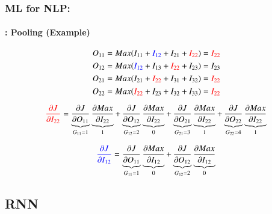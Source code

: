 \documentclass[xcolor=table]{beamer}
\begin{document}
	\begin{frame}
		\frametitle{ML for NLP: \insertsection}
		\framesubtitle{\insertsubsection: Pooling (Example)}
		
		\begin{center}
			\vskip-6pt
		\end{center}\vskip-16pt
		
		{\scriptsize 
			\[O_{11} = Max(I_{11} + \textcolor{blue}{I_{12}} + I_{21} + \textcolor{red}{I_{22}}) = \textcolor{red}{I_{22}}  \]
			\[O_{12} = Max(\textcolor{blue}{I_{12}} + I_{13} + \textcolor{red}{I_{22}} + I_{23}) = I_{23}  \]
			\[O_{21} = Max(I_{21} + \textcolor{red}{I_{22}} + I_{31} + I_{32}) = \textcolor{red}{I_{22}} \]
			\[O_{22} = Max(\textcolor{red}{I_{22}} + I_{23} + I_{32} + I_{33}) = \textcolor{red}{I_{22}}  \]
			
			\[\textcolor{red}{\frac{\partial J}{\partial I_{22}}} 
			= \underbrace{\frac{\partial J}{\partial O_{11}}}_{G_{11} = 1} 
			\underbrace{\frac{\partial Max}{\partial I_{22}}}_{1}
			+ \underbrace{\frac{\partial J}{\partial O_{12}}}_{G_{12} = 2} 
			\underbrace{\frac{\partial Max}{\partial I_{22}}}_{0}
			+ \underbrace{\frac{\partial J}{\partial O_{21}}}_{G_{21} = 3} 
			\underbrace{\frac{\partial Max}{\partial I_{22}}}_{1}
			+ \underbrace{\frac{\partial J}{\partial O_{22}}}_{G_{22} = 4} 
			\underbrace{\frac{\partial Max}{\partial I_{22}}}_{1}\]
			
			\[\textcolor{blue}{\frac{\partial J}{\partial I_{12}}} 
			= \underbrace{\frac{\partial J}{\partial O_{11}}}_{G_{11} = 1} 
			\underbrace{\frac{\partial Max}{\partial I_{12}}}_{0}
			+ \underbrace{\frac{\partial J}{\partial O_{12}}}_{G_{12} = 2} 
			\underbrace{\frac{\partial Max}{\partial I_{12}}}_{0}\]
		}
		
	\end{frame}
	
	\subsection{RNN}
	
\end{document}

